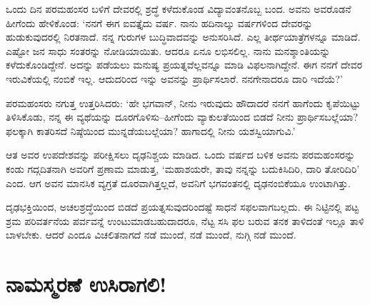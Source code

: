 
ಒಂದು ದಿನ ಪರಮಹಂಸರ ಬಳಿಗೆ ದೇವರಲ್ಲಿ ಶ್ರದ್ಧೆ ಕಳೆದುಕೊಂಡ ವಿದ್ಯಾವಂತನೊಬ್ಬ ಬಂದ. ಅವನು ಅವರೊಡನೆ ಹೀಗೆಂದು ಹೇಳಿಕೊಂಡ: ‘ನನಗೆ ಈಗ ಐವತ್ತೈದು ವರ್ಷ. ನಾನು ಹದಿನಾಲ್ಕು ವರ್ಷಗಳಿಂದ ದೇವರನ್ನು ಹುಡುಕುವುದರಲ್ಲಿ ನಿರತನಾದೆ. ನನ್ನ ಗುರುಗಳ ಬುದ್ಧಿ\-ವಾದವನ್ನು ಅನುಸರಿಸಿದೆ. ಎಲ್ಲ ತೀರ್ಥಯಾತ್ರೆಗಳನ್ನೂ ಮಾಡಿದೆ. ಎಷ್ಟೋ ಜನ ಸಾಧು ಸಂತರನ್ನು ನೋಡಿಯಾಯಿತು. ಆದರೂ ಏನೂ ಲಭಿಸಲಿಲ್ಲ. ನಾನು ಮನಶ್ಶಾಂತಿಯನ್ನು ಕಳೆದುಕೊಂಡಿದ್ದೇನೆ. ಅದನ್ನು ಪಡೆಯಲು ಮನುಷ್ಯ ಪ್ರಯತ್ನವೆಲ್ಲವನ್ನೂ ಮಾಡಿ ವಿಫಲನಾಗಿದ್ದೇನೆ. ಈಗ ನನಗೆ ದೇವರ ಇರುವಿಕೆಯಲ್ಲಿ ನಂಬಿಕೆ ಇಲ್ಲ. ಆದುದರಿಂದ ಇನ್ನು ಅವನನ್ನು ಪ್ರಾರ್ಥಿಸಲಾರೆ. ನನಗೇನಾದರೂ ದಾರಿ ಇದೆಯೆ?’

ಪರಮಹಂಸರು ನಗುತ್ತ ಉತ್ತರಿಸಿದರು: ‘ಹೇ ಭಗವಾನ್, ನೀನು ಇರುವುದು ಹೌದಾದರೆ ನನಗೆ ಹಾಗೆಂದು ಕೃಪೆಯಿಟ್ಟು ತಿಳಿಸಿಕೊಡು, ನನ್ನ ಈ ವ್ಯಥೆಯನ್ನು ದೂರಗೊಳಿಸು–ಹೀಗೆಂದು ವ್ಯಾಕುಲತೆಯಿಂದ ಬಿಡದೆ ನೀನು ಪ್ರಾರ್ಥಿಸಬಲ್ಲೆಯಾ? ಫಲಕ್ಕಾಗಿ ಕಾತರಿಸದೆ ನಿಷ್ಠೆಯಿಂದ ಮುನ್ನಡೆಯಬಲ್ಲೆಯಾ? ಹಾಗಾದಲ್ಲಿ ನೀನು ಯಶಸ್ವಿಯಾಗುವಿ.’

ಆತ ಅವರ ಉಪದೇಶವನ್ನು ಪರೀಕ್ಷಿಸಲು ದೃಢನಿಶ್ಚಯ ಮಾಡಿದ. ಒಂದು ವರ್ಷದ ಬಳಿಕ ಅವನು ಪರಮಹಂಸರನ್ನು ಕಂಡು ಗದ್ಗದಿತನಾಗಿ ಅವರಿಗೆ ಪ್ರಣಾಮ ಮಾಡುತ್ತ, ‘ಮಹಾಶಯರೇ, ತಾವು ನನ್ನನ್ನು ಬದುಕಿಸಿದಿರಿ, ದಾರಿ ತೋರಿದಿರಿ’ ಎಂದ. ಆಗ ಅವನ ಮಾನಸಿಕ ವ್ಯಗ್ರತೆ ದೂರ\-ವಾಗಿತ್ತಲ್ಲದೆ, ಅವನಿಗೆ ಭಗವಂತನಲ್ಲಿ ದೃಢನಂಬಿಕೆಯೂ ಉಂಟಾಗಿತ್ತು.

ದೃಢಭಕ್ತಿಯಿಂದ, ಅಚಲಶ್ರದ್ಧೆಯಿಂದ ಬಿಡದೆ ಪ್ರಯತ್ನಸುವುದರಿಂದಷ್ಟೆ ಸಾಧನೆ ಸಫಲ\-ವಾಗ\-ಬಲ್ಲದು. ಈ ನಿಟ್ಟಿನಲ್ಲಿ ಪಟ್ಟ ಶ್ರಮ ಪರಿವರ್ತನೆಯ ಪರ್ವವನ್ನೆ ಉಂಟುಮಾಡಬಹುದಾದರೂ, ನೆಟ್ಟ ಸಸಿ ಫಲ ಬರುವ ತನಕ ತಾಳಿದಂತೆ ಇಲ್ಲೂ ತಾಳಿ ಬಾಳಬೇಕು. ಆದರೆ ಎಂದೂ ವಿಚಲಿತನಾಗದೆ ನಡೆ ಮುಂದೆ, ನಡೆ ಮುಂದೆ, ನುಗ್ಗಿ ನಡೆ ಮುಂದೆ.


\section*{ನಾಮಸ್ಮರಣೆ ಉಸಿರಾಗಲಿ!}


